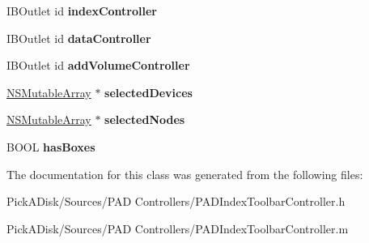 \begin{DoxyCompactItemize}
\item 
\hypertarget{interface_p_a_d_index_toolbar_controller_aff3d53ad50ee1866bb99b42ebdd51750}{
IBOutlet id {\bfseries indexController}}
\label{interface_p_a_d_index_toolbar_controller_aff3d53ad50ee1866bb99b42ebdd51750}

\item 
\hypertarget{interface_p_a_d_index_toolbar_controller_a3b2a98084a5e18fa51e982dc89482a87}{
IBOutlet id {\bfseries dataController}}
\label{interface_p_a_d_index_toolbar_controller_a3b2a98084a5e18fa51e982dc89482a87}

\item 
\hypertarget{interface_p_a_d_index_toolbar_controller_a35a4c3dbb37c435e5117f4d9cc51abae}{
IBOutlet id {\bfseries addVolumeController}}
\label{interface_p_a_d_index_toolbar_controller_a35a4c3dbb37c435e5117f4d9cc51abae}

\item 
\hypertarget{interface_p_a_d_index_toolbar_controller_a1814d1c63f09b3a10786158de49692e7}{
\hyperlink{class_n_s_mutable_array}{NSMutableArray} $\ast$ {\bfseries selectedDevices}}
\label{interface_p_a_d_index_toolbar_controller_a1814d1c63f09b3a10786158de49692e7}

\item 
\hypertarget{interface_p_a_d_index_toolbar_controller_ad3b05daf261af8bc39f45e2e82590c84}{
\hyperlink{class_n_s_mutable_array}{NSMutableArray} $\ast$ {\bfseries selectedNodes}}
\label{interface_p_a_d_index_toolbar_controller_ad3b05daf261af8bc39f45e2e82590c84}

\item 
\hypertarget{interface_p_a_d_index_toolbar_controller_a015053d95fabf358d8e602454a99f9cf}{
BOOL {\bfseries hasBoxes}}
\label{interface_p_a_d_index_toolbar_controller_a015053d95fabf358d8e602454a99f9cf}

\end{DoxyCompactItemize}


The documentation for this class was generated from the following files:\begin{DoxyCompactItemize}
\item 
PickADisk/Sources/PAD Controllers/PADIndexToolbarController.h\item 
PickADisk/Sources/PAD Controllers/PADIndexToolbarController.m\end{DoxyCompactItemize}

